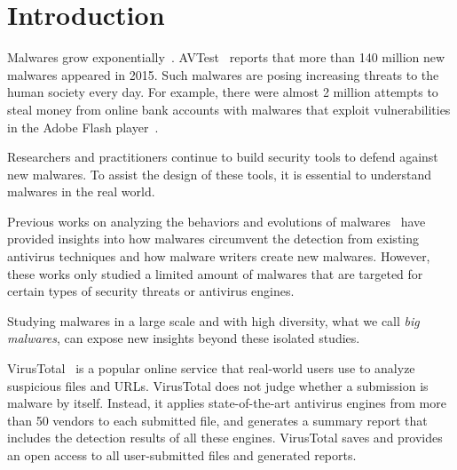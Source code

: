 \section{Introduction}

Malwares grow exponentially~\cite{avtest}. 
AVTest~\cite{avtest} reports that more than 140 million new malwares appeared in 2015. 
Such malwares are posing increasing threats to the human society every day. 
For example, there were almost 2 million attempts to 
steal money from online bank accounts 
with malwares that exploit vulnerabilities in the Adobe Flash player~\cite{kaspersky}. 

Researchers and practitioners continue to build security tools to defend against new malwares.
To assist the design of these tools, it is essential to understand malwares in the real world. 

Previous works on analyzing the behaviors and evolutions of malwares~\cite{ZhouSP2012,GuptaComsnets2009} 
have provided insights 
into how malwares circumvent the detection from existing antivirus techniques and how malware writers create new malwares. 
However, these works only studied a limited amount of malwares that are targeted for certain types of security threats or antivirus engines.

Studying malwares in a large scale and with high diversity, what we call {\em big malwares}, 
can expose new insights beyond these isolated studies.



VirusTotal~\cite{virustotal} is a popular online service that real-world users use to analyze suspicious files and URLs.
VirusTotal does not judge whether a submission is malware by itself. Instead,
it applies state-of-the-art antivirus engines from more than 50 vendors to each submitted file, 
and generates a summary report that includes the detection results of all these engines.
VirusTotal saves and provides an open access to all user-submitted files and generated reports. 


